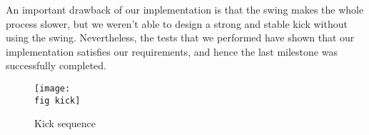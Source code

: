 An important drawback of our implementation is that the swing makes the whole
process slower, but we weren't able to design a strong and stable kick without
using the swing. Nevertheless, the tests that we performed have shown that our
implementation satisfies our requirements, and hence the last milestone was
successfully completed.\\


\begin{figure}[ht]
\texttt{[image: \\fig kick]}
\caption{Kick sequence}
\label{p figure kick}
\end{figure}

